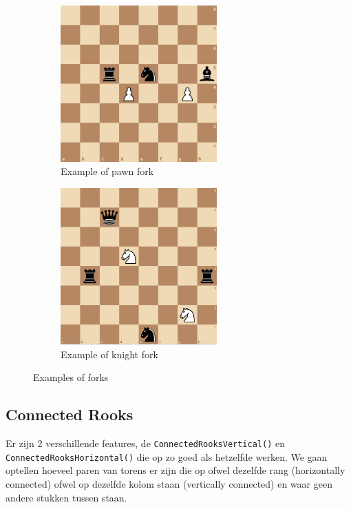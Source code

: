 \documentclass[a4paper,openany]{uantwerpenassignment}
\newcommand{\codeword}[1]{
    \colorbox{code}{\texttt{\textcolor{codetext}{#1}}}
}
\begin{document}
\begin{figure}[h]
    \centering
    \begin{subfigure}{.4\textwidth}
        \includegraphics[width=170pt]{images/pawnFork.png}
        \caption{Example of pawn fork}
        \label{fig:pawnFork}
    \end{subfigure}
    \begin{subfigure}{.4\textwidth}
        \includegraphics[width=170pt]{images/knightFork.png}
        \caption{Example of knight fork}
        \label{fig:knightFork}
    \end{subfigure}
    \caption{Examples of forks}
\end{figure}

\subsection{Connected Rooks}
\label{connectedRooks}
Er zijn 2 verschillende features, de \codeword{ConnectedRooksVertical()} en \codeword{ConnectedRooksHorizontal()} die op zo goed als hetzelfde werken. We gaan optellen hoeveel paren van torens er zijn die op ofwel dezelfde rang (horizontally connected) ofwel op dezelfde kolom staan (vertically connected) en waar geen andere stukken tussen staan.
\end{document}
